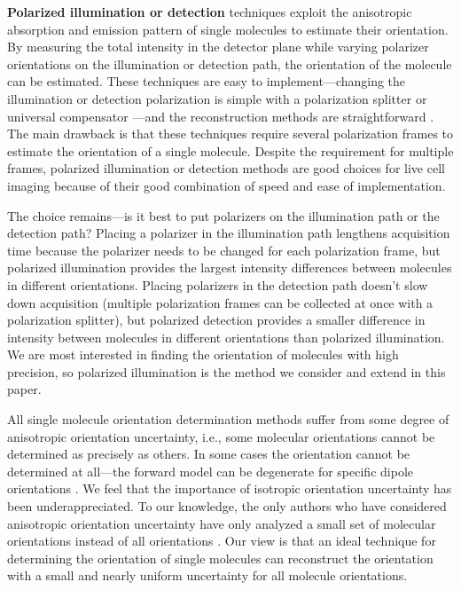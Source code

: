 \documentclass[10pt]{article}
\begin{document}
\textbf{Polarized illumination or detection} techniques exploit the anisotropic
absorption and emission pattern of single molecules to estimate their
orientation. By measuring the total intensity in the detector plane while
varying polarizer orientations on the illumination or detection path, the
orientation of the molecule can be estimated. These techniques are easy to
implement---changing the illumination or detection polarization is simple with a
polarization splitter \cite{mehta2016} or universal compensator
\cite{oldenbourg1995}---and the reconstruction methods are straightforward
\cite{fourkas2001, mehta2016, backer2016}. The main drawback is that these
techniques require several polarization frames to estimate the orientation of a
single molecule. Despite the requirement for multiple frames, polarized
illumination or detection methods are good choices for live cell imaging because
of their good combination of speed and ease of implementation.

The choice remains---is it best to put polarizers on the illumination path or
the detection path? Placing a polarizer in the illumination path lengthens
acquisition time because the polarizer needs to be changed for each polarization
frame, but polarized illumination provides the largest intensity differences
between molecules in different orientations. Placing polarizers in the detection
path doesn't slow down acquisition (multiple polarization frames can be
collected at once with a polarization splitter), but polarized detection
provides a smaller difference in intensity between molecules in different
orientations than polarized illumination. We are most interested in finding the
orientation of molecules with high precision, so polarized illumination is the
method we consider and extend in this paper.

All single molecule orientation determination methods suffer from some degree of
anisotropic orientation uncertainty, i.e., some molecular orientations cannot be
determined as precisely as others. In some cases the orientation cannot be
determined at all---the forward model can be degenerate for specific dipole
orientations \cite{fourkas2001, lu2008}. We feel that the importance of
isotropic orientation uncertainty has been underappreciated. To our knowledge,
the only authors who have considered anisotropic orientation uncertainty have
only analyzed a small set of molecular orientations instead of all orientations
\cite{agrawal2012}. Our view is that an ideal technique for determining the
orientation of single molecules can reconstruct the orientation with a small and
nearly uniform uncertainty for all molecule orientations.
\end{document}
